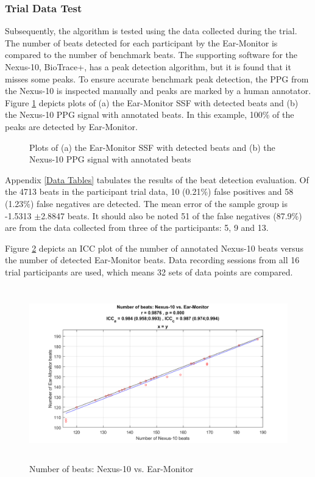 \subsubsection{Trial Data Test}
Subsequently, the algorithm is tested using the data collected during the trial. The number of beats detected for each participant by the Ear-Monitor is compared to the number of benchmark beats. The supporting software for the Nexus-10, BioTrace+, has a peak detection algorithm, but it is found that it misses some peaks. To ensure accurate benchmark peak detection, the PPG from the Nexus-10 is inspected manually and peaks are marked by a human annotator. Figure \ref{fig:BeatDetectionTest} depicts plots of (a) the Ear-Monitor SSF with detected beats and (b) the Nexus-10 PPG signal with annotated beats. In this example, 100\% of the peaks are detected by Ear-Monitor.

\begin{figure}[H]
\centering
\graphicspath{{figs/}}

\caption{Plots of (a) the Ear-Monitor SSF with detected beats and (b) the Nexus-10 PPG signal with annotated beats} %
\label{fig:BeatDetectionTest}
\end{figure}

Appendix \ref{Data Tables} tabulates the results of the beat detection evaluation. Of the 4713 beats in the participant trial data, 10 (0.21\%) false positives and 58 (1.23\%) false negatives are detected. The mean error of the sample group is -1.5313 $\pm$2.8847 beats. It should also be noted 51 of the false negatives (87.9\%) are from the data collected from three of the participants: 5, 9 and 13.

\medskip

Figure \ref{fig:BeatDetectionScatter} depicts an ICC plot of the number of annotated Nexus-10 beats versus the number of detected Ear-Monitor beats. Data recording sessions from all 16 trial participants are used, which means 32 sets of data points are compared.

\begin{figure}[H]
   \centering
   \includegraphics[width=12cm,height=7.5cm]{figs/BeatDetectionScatter.png}
   \caption{Number of beats: Nexus-10 vs. Ear-Monitor}
   \label{fig:BeatDetectionScatter}
\end{figure}

